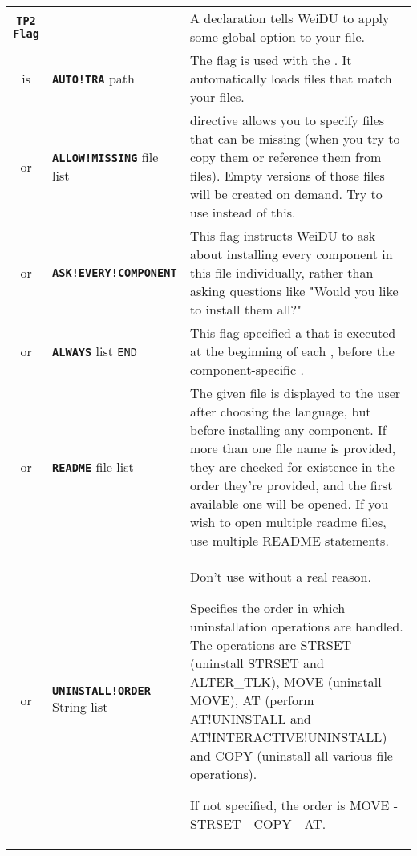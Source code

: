 \documentclass{article}
\def\ttref#1{\ahrefloc{#1}{\tt #1}}
\def\DEFINE#1{{\tt \bf #1}\label{#1}\index{#1}}
\def\DEFSYN#1{{\tt \bf #1}\index{#1}}
\def\t#1{{\tt #1}}
\def\Slist{{\color{red} list }}
\begin{document}
\begin{tabular}{cp{10in}|p{10in}}
\DEFINE{TP2 Flag} & & A \ttref{TP2 Flag} declaration tells WeiDU to apply some
global option to your \ttref{TP2} file. \\
  is & \DEFINE{AUTO!TRA} path &
       The \ttref{AUTO!TRA} flag is used
       with the \ttref{COMPILE} \ttref{TP2 Action}. It automatically loads
       \ttref{TRA} files that match your \ttref{D} files.  \\
  or & \DEFINE{ALLOW!MISSING} file \Slist & 
       \ttref{ALLOW!MISSING} directive allows you to specify files that can
       be missing (when you try to copy them or reference them from
       \ttref{D} files). Empty versions of those files will be created on
       demand. Try to use \ttref{ACTION!IF} instead of this. \\
  or & \DEFINE{ASK!EVERY!COMPONENT} & 
       This flag instructs WeiDU to ask about installing every component in
       this \ttref{TP2} file individually, rather than asking questions
       like "Would you like to install them all?" \\
  or & \DEFINE{ALWAYS} \ttref{TP2 Action} \Slist \t{END} &
       This flag specified a \ttref{TP2 Action} that is executed at the beginning
       of each \ttref{Component}, before the component-specific \ttref{TP2 Action}.  \\
  or & \DEFINE{README} file \Slist &
       The given file is displayed to the user after choosing the language, but
       before installing any component. If more than one file name is provided,
       they are checked for existence in the order they're provided, and the first available
       one will be opened. If you wish to open multiple readme files, use multiple README
       statements.
  \\
  or & \DEFSYN{UNINSTALL!ORDER} String \Slist &
		Don't use without a real reason.
		
		Specifies the order in which uninstallation operations are handled.
		The operations are STRSET (uninstall STRSET and ALTER_TLK), MOVE
		(uninstall MOVE), AT (perform AT!UNINSTALL and AT!INTERACTIVE!UNINSTALL) and
		COPY (uninstall all various file operations).
		
		If not specified, the order is MOVE - STRSET - COPY - AT.
		

\end{tabular}
\end{document}
